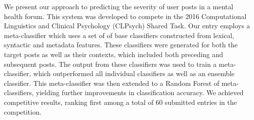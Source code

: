 We present our approach to predicting the severity of user posts in a mental health forum. This system was developed to compete in the 2016 Computational Linguistics and Clinical Psychology (CLPsych) Shared Task. Our entry employs a meta-classifier which uses a set of of base classifiers constructed from lexical, syntactic and metadata features. These classifiers were generated for both the target posts as well as their contexts, which included both preceding and subsequent posts. The output from these classifiers was used to train a meta-classifier, which outperformed all individual classifiers as well as an ensemble classifier. This meta-classifier was then extended to a Random Forest of meta-classifiers, yielding further improvements in classification accuracy. We achieved competitive results, ranking first among a total of 60 submitted entries in the competition.

